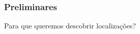 \documentclass{beamer}
\begin{document}
\begin{frame}
\frametitle{\normalsize Preliminares} 
\begin{center} 
\large Para que queremos descobrir localizações?
\end{center}

\begin{figure}

\hspace{0.3cm}
\\

\end{figure}
\end{frame}
\end{document}
